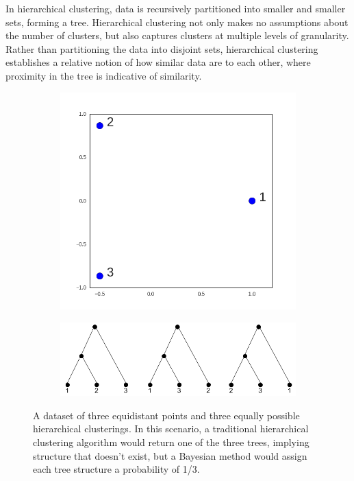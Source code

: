 \documentclass{article}
\begin{document}
In hierarchical clustering,
data is recursively
partitioned into smaller and smaller
sets, forming a tree.
Hierarchical clustering not only makes no assumptions
about the number of clusters,
but also captures
clusters at multiple
levels of granularity.
Rather than partitioning
the data into disjoint sets,
hierarchical clustering
establishes a relative notion
of how similar data are to each other,
where proximity in the tree
is indicative of similarity.

\begin{figure}[H]
    \centering
    \begin{subfigure}[b]{0.27\textwidth}
        \centering
        \includegraphics[width=\textwidth]{img/3data}
    \end{subfigure}
    \hfill
    \begin{subfigure}[b]{0.72\textwidth}
        \centering
        \includegraphics[width=\textwidth]{img/Ambiguous}
    \end{subfigure}
    \caption{A dataset of three equidistant points and three equally possible
    hierarchical clusterings. In this scenario, a traditional hierarchical
    clustering algorithm would return one of the three trees,
    implying structure that doesn't exist, but a Bayesian
    method would assign each tree structure a probability of 1/3.}
    \label{fig:ambiguous}
\end{figure}
\end{document}
